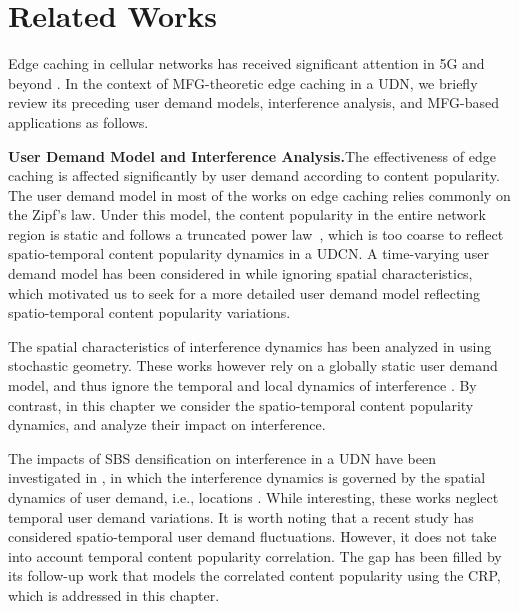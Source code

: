 \documentclass{book}
\begin{document}
\section{Related Works} \label{Related work}
Edge caching in cellular networks has received significant attention in 5G and beyond \cite{caching_tradeoff:2016,caching_effect,PIEEE1}. In the context of MFG-theoretic edge caching in a UDN, we briefly review its preceding user demand models, interference analysis, and MFG-based applications as follows.


\textbf{User Demand Model and Interference Analysis.}\quad The effectiveness of edge caching is affected significantly by user demand according to content popularity. The user demand model in most of the works on edge caching relies commonly on the Zipf's law. Under this model, the content popularity in the entire network region is static and follows a truncated power law~\cite{Zipf_1}, which is too coarse to reflect spatio-temporal content popularity dynamics in a UDCN. A time-varying user demand model has been considered in \cite{caching_dyna1,MFG_caching} while ignoring spatial characteristics, which motivated us to seek for a more detailed user demand model reflecting spatio-temporal content popularity variations.

The spatial characteristics of interference dynamics has been analyzed in \cite{caching_dyna2,spatially_corr} using stochastic geometry. These works however rely on a globally static user demand model, and thus ignore the temporal and local dynamics of interference \cite{local_global}. By contrast, in this chapter we consider the spatio-temporal content popularity dynamics, and analyze their impact on interference. 


The impacts of SBS densification on interference in a UDN have been investigated in \cite{interf_udn,JHP1,JHP2,PIMRC17,JParkSpaSWiN:17,KimAccess,Nemati}, in which the interference dynamics is governed by the spatial dynamics of user demand, i.e., locations \cite{interf_udn}. While interesting, these works neglect temporal user demand variations. It is worth noting that a recent study \cite{ICC} has considered spatio-temporal user demand fluctuations. However, it does not take into account temporal content popularity correlation. The gap has been filled by its follow-up work \cite{TVT} that models the correlated content popularity using the CRP, which is addressed in this chapter.
\end{document}
